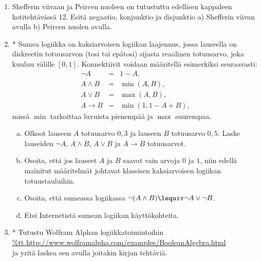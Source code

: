 \begin{kotitehtavasivu}
\begin{enumerate}
\item Shefferin viivaan ja Peircen nuoleen on tutustuttu
edellisen kappaleen kotitehtävässä 12. Esitä negaatio,
konjunktio ja disjunktio a) Shefferin viivan avulla b)
Peircen nuolen avulla.

\item *
Sumea logiikka on kaksiarvoisen logiikan
laajennus, jossa lauseella on diskreetin totuusarvon
(tosi tai epätosi) sijasta reaalinen totuusarvo, joka
kuuluu välille $[0, 1]$. Konnektiivit voidaan määritellä
esimerkiksi seuraavasti:
\[
\begin{array}{rcl}
\lnot A &=& 1-A,\\
A\land B &=& \min(A, B),\\
A\lor B &=& \max(A, B),\\
A\to B
&=& \min(1, 1-A+B),
\end{array}
\]
missä $\min$ tarkoittaa luvuista pienempää ja $\max$
suurempaa.

\begin{enumerate}[a)]
\item Olkoot lauseen $A$ totuusarvo $0,3$ ja lauseen
$B$ totuusarvo $0,5$. Laske lauseiden $\lnot A$, $A\land
B$, $A\lor B$ ja $A \to B$ totuusarvot.
\item Osoita, että jos lauseet $A$ ja $B$ saavat
vain arvoja $0$ ja $1$, niin edellä mainitut määritelmät johtavat
klassisen kaksiarvoisen logiikan totuustauluihin.
\item Osoita, että sumeassa logiikassa $\lnot(A\land B)
\lequiv \lnot A \lor \lnot B$.
\item Etsi Internetistä sumean logiikan
käyttökohteita.
\end{enumerate}

\item *
Tutustu Wolfram Alphan
logiikkatoimintoihin\\
\href{http://www.wolframalpha.com/examples/BooleanAlgebra.html}{{\%tt http://www.wolframalpha.com/examples/BooleanAlgebra.html}}\\
ja yritä laskea sen avulla joitakin kirjan tehtäviä.


\end{enumerate}

\end{kotitehtavasivu}

